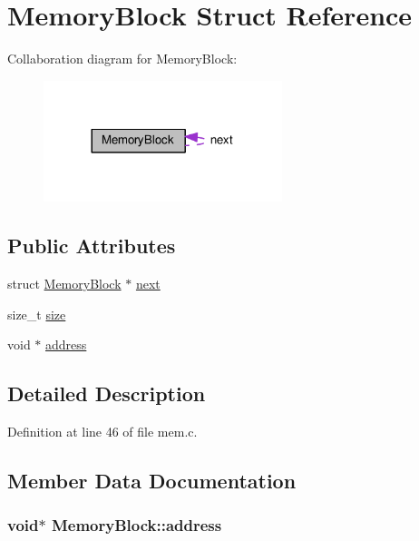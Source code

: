 \hypertarget{structMemoryBlock}{}\section{Memory\+Block Struct Reference}
\label{structMemoryBlock}


Collaboration diagram for Memory\+Block\+:\nopagebreak
\begin{figure}[H]
\begin{center}
\leavevmode
\includegraphics[width=197pt]{structMemoryBlock__coll__graph}
\end{center}
\end{figure}
\subsection*{Public Attributes}
\begin{DoxyCompactItemize}
\item 
struct \hyperlink{structMemoryBlock}{Memory\+Block} $\ast$ \hyperlink{structMemoryBlock_aead31940b4b95725f6f580e2db3cfb87}{next}
\item 
size\+\_\+t \hyperlink{structMemoryBlock_a1d0be8990a795dfe51c99d3ea0ac774e}{size}
\item 
void $\ast$ \hyperlink{structMemoryBlock_a3725613ab053a5e2a814061362fe215a}{address}
\end{DoxyCompactItemize}


\subsection{Detailed Description}


Definition at line 46 of file mem.\+c.



\subsection{Member Data Documentation}
\subsubsection[{\texorpdfstring{address}{address}}]{\setlength{\rightskip}{0pt plus 5cm}void$\ast$ Memory\+Block\+::address}\hypertarget{structMemoryBlock_a3725613ab053a5e2a814061362fe215a}{}\label{structMemoryBlock_a3725613ab053a5e2a814061362fe215a}


